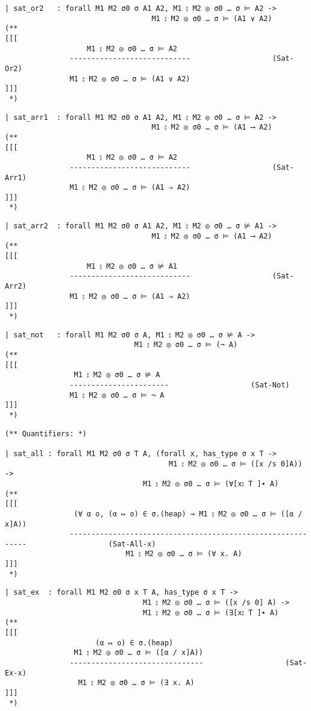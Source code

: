 \documentclass[12pt]{article}
\begin{document}
\begin{verbatim}
| sat_or2   : forall M1 M2 σ0 σ A1 A2, M1 ⦂ M2 ◎ σ0 … σ ⊨ A2 ->
                                  M1 ⦂ M2 ◎ σ0 … σ ⊨ (A1 ∨ A2)
(**
[[[
                   M1 ⦂ M2 ◎ σ0 … σ ⊨ A2
               ----------------------------                   (Sat-Or2)
               M1 ⦂ M2 ◎ σ0 … σ ⊨ (A1 ∨ A2)
]]]
 *)
\end{verbatim}
\begin{verbatim}
| sat_arr1  : forall M1 M2 σ0 σ A1 A2, M1 ⦂ M2 ◎ σ0 … σ ⊨ A2 ->
                                  M1 ⦂ M2 ◎ σ0 … σ ⊨ (A1 ⟶ A2)
(**
[[[
                   M1 ⦂ M2 ◎ σ0 … σ ⊨ A2
               ----------------------------                   (Sat-Arr1)
               M1 ⦂ M2 ◎ σ0 … σ ⊨ (A1 ⇒ A2)
]]]
 *)
\end{verbatim}
\begin{verbatim}
| sat_arr2  : forall M1 M2 σ0 σ A1 A2, M1 ⦂ M2 ◎ σ0 … σ ⊭ A1 ->
                                  M1 ⦂ M2 ◎ σ0 … σ ⊨ (A1 ⟶ A2)
(**
[[[
                   M1 ⦂ M2 ◎ σ0 … σ ⊭ A1
               ----------------------------                   (Sat-Arr2)
               M1 ⦂ M2 ◎ σ0 … σ ⊨ (A1 ⇒ A2)
]]]
 *)
\end{verbatim}
\begin{verbatim}
| sat_not   : forall M1 M2 σ0 σ A, M1 ⦂ M2 ◎ σ0 … σ ⊭ A ->
                              M1 ⦂ M2 ◎ σ0 … σ ⊨ (¬ A)
(**
[[[
                M1 ⦂ M2 ◎ σ0 … σ ⊭ A
               -----------------------                   (Sat-Not)
               M1 ⦂ M2 ◎ σ0 … σ ⊨ ¬ A
]]]
 *)
\end{verbatim}
\begin{verbatim}
(** Quantifiers: *)

| sat_all : forall M1 M2 σ0 σ T A, (forall x, has_type σ x T ->
                                      M1 ⦂ M2 ◎ σ0 … σ ⊨ ([x /s 0]A)) ->
                                M1 ⦂ M2 ◎ σ0 … σ ⊨ (∀[x⦂ T ]∙ A)
(**
[[[
                (∀ α o, (α ↦ o) ∈ σ.(heap) → M1 ⦂ M2 ◎ σ0 … σ ⊨ ([α / x]A))
               ------------------------------------------------------------                   (Sat-All-x)
                            M1 ⦂ M2 ◎ σ0 … σ ⊨ (∀ x. A)
]]]
 *)
\end{verbatim}
\begin{verbatim}
| sat_ex  : forall M1 M2 σ0 σ x T A, has_type σ x T ->
                                M1 ⦂ M2 ◎ σ0 … σ ⊨ ([x /s 0] A) ->
                                M1 ⦂ M2 ◎ σ0 … σ ⊨ (∃[x⦂ T ]∙ A)
(**
[[[
                     (α ↦ o) ∈ σ.(heap)
                M1 ⦂ M2 ◎ σ0 … σ ⊨ ([α / x]A))
               -------------------------------                   (Sat-Ex-x)
                 M1 ⦂ M2 ◎ σ0 … σ ⊨ (∃ x. A)
]]]
 *)
\end{verbatim}
\end{document}

